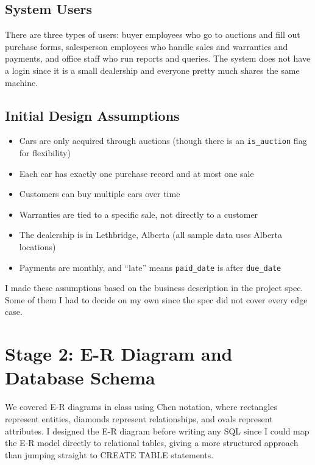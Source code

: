 \documentclass[12pt]{article}
\begin{document}
\subsection{System Users}

There are three types of users: buyer employees who go to auctions and fill out purchase forms, salesperson employees who handle sales and warranties and payments, and office staff who run reports and queries. The system does not have a login since it is a small dealership and everyone pretty much shares the same machine.

\subsection{Initial Design Assumptions}

\begin{itemize}
  \item Cars are only acquired through auctions (though there is an \texttt{is\_auction} flag for flexibility)
  \item Each car has exactly one purchase record and at most one sale
  \item Customers can buy multiple cars over time
  \item Warranties are tied to a specific sale, not directly to a customer
  \item The dealership is in Lethbridge, Alberta (all sample data uses Alberta locations)
  \item Payments are monthly, and ``late'' means \texttt{paid\_date} is after \texttt{due\_date}
\end{itemize}

I made these assumptions based on the business description in the project spec. Some of them I had to decide on my own since the spec did not cover every edge case.

\section{Stage 2: E-R Diagram and Database Schema}

We covered E-R diagrams in class using Chen notation, where rectangles represent entities, diamonds represent relationships, and ovals represent attributes. I designed the E-R diagram before writing any SQL since I could map the E-R model directly to relational tables, giving a more structured approach than jumping straight to CREATE TABLE statements.
\end{document}
